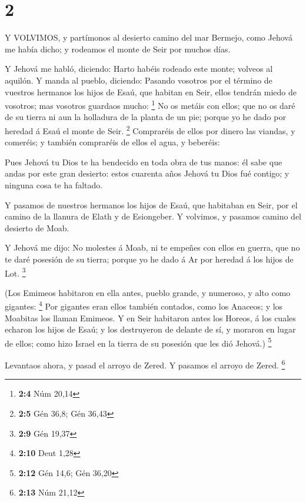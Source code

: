 \hypertarget{section-1}{%
\section{2}\label{section-1}}

 Y VOLVIMOS, y partímonos al desierto camino del mar
Bermejo, como Jehová me había dicho; y rodeamos el monte de Seir por
muchos días.

 Y Jehová me habló, diciendo:  Harto habéis
rodeado este monte; volveos al aquilón.  Y manda al pueblo,
diciendo: Pasando vosotros por el término de vuestros hermanos los hijos
de Esaú, que habitan en Seir, ellos tendrán miedo de vosotros; mas
vosotros guardaos mucho: \footnote{\textbf{2:4} Núm 20,14} 
No os metáis con ellos; que no os daré de su tierra ni aun la holladura
de la planta de un pie; porque yo he dado por heredad á Esaú el monte de
Seir. \footnote{\textbf{2:5} Gén 36,8; Gén 36,43} 
Compraréis de ellos por dinero las viandas, y comeréis; y también
compraréis de ellos el agua, y beberéis:

 Pues Jehová tu Dios te ha bendecido en toda obra de tus
manos: él sabe que andas por este gran desierto: estos cuarenta años
Jehová tu Dios fué contigo; y ninguna cosa te ha faltado.

 Y pasamos de nuestros hermanos los hijos de Esaú, que
habitaban en Seir, por el camino de la llanura de Elath y de Esiongeber.
Y volvimos, y pasamos camino del desierto de Moab.

 Y Jehová me dijo: No molestes á Moab, ni te empeñes con
ellos en guerra, que no te daré posesión de su tierra; porque yo he dado
á Ar por heredad á los hijos de Lot. \footnote{\textbf{2:9} Gén 19,37}

 (Los Emimeos habitaron en ella antes, pueblo grande, y
numeroso, y alto como gigantes: \footnote{\textbf{2:10} Deut 1,28}
 Por gigantes eran ellos también contados, como los
Anaceos; y los Moabitas los llaman Emimeos.  Y en Seir
habitaron antes los Horeos, á los cuales echaron los hijos de Esaú; y
los destruyeron de delante de sí, y moraron en lugar de ellos; como hizo
Israel en la tierra de su posesión que les dió Jehová.) \footnote{\textbf{2:12}
  Gén 14,6; Gén 36,20}

 Levantaos ahora, y pasad el arroyo de Zered. Y pasamos el
arroyo de Zered. \footnote{\textbf{2:13} Núm 21,12}

